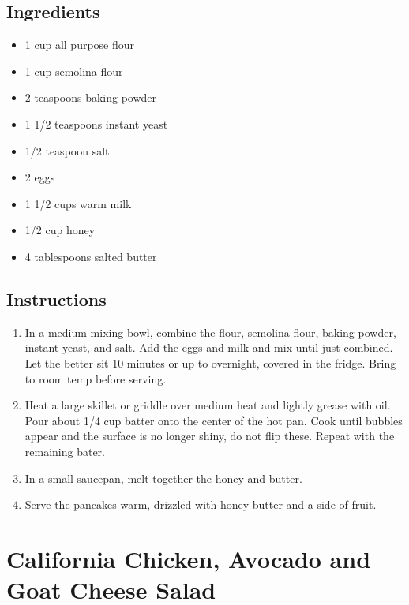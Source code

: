 \documentclass[
  letterpaper,
  DIV=11,
  numbers=noendperiod,
  titlepage=false]{scrreprt}
\providecommand{\tightlist}{%
  \setlength{\itemsep}{0pt}\setlength{\parskip}{0pt}}\usepackage{longtable,booktabs,array}
\begin{document}
\section{Ingredients}\label{ingredients-111}

\begin{itemize}
\tightlist
\item
  1 cup all purpose flour
\item
  1 cup semolina flour
\item
  2 teaspoons baking powder
\item
  1 1/2 teaspoons instant yeast
\item
  1/2 teaspoon salt
\item
  2 eggs
\item
  1 1/2 cups warm milk
\item
  1/2 cup honey
\item
  4 tablespoons salted butter
\end{itemize}

\section{Instructions}\label{instructions-111}

\begin{enumerate}
\def\labelenumi{\arabic{enumi}.}
\tightlist
\item
  In a medium mixing bowl, combine the flour, semolina flour, baking
  powder, instant yeast, and salt. Add the eggs and milk and mix until
  just combined. Let the better sit 10 minutes or up to overnight,
  covered in the fridge. Bring to room temp before serving.
\item
  Heat a large skillet or griddle over medium heat and lightly grease
  with oil. Pour about 1/4 cup batter onto the center of the hot pan.
  Cook until bubbles appear and the surface is no longer shiny, do not
  flip these. Repeat with the remaining bater.
\item
  In a small saucepan, melt together the honey and butter.
\item
  Serve the pancakes warm, drizzled with honey butter and a side of
  fruit.
\end{enumerate}


\chapter{California Chicken, Avocado and Goat Cheese
Salad}\label{california-chicken-avocado-and-goat-cheese-salad}
\end{document}
